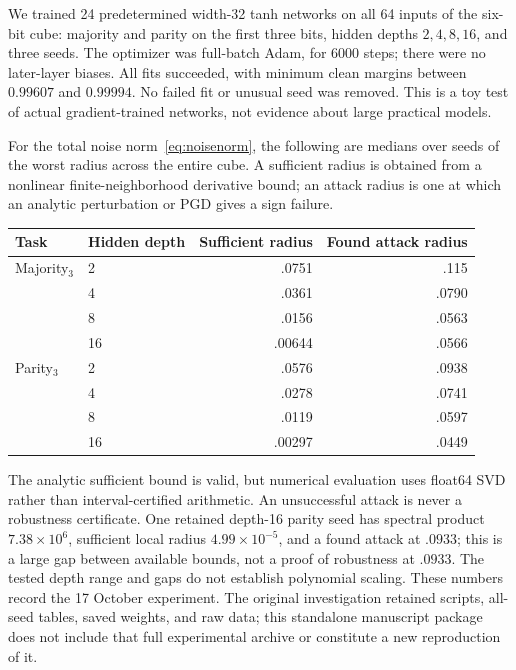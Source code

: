 \documentclass[11pt]{article}
\begin{document}
We trained 24 predetermined width-32 tanh networks on all 64 inputs of the
six-bit cube: majority and parity on the first three bits, hidden depths
$2,4,8,16$, and three seeds. The optimizer was full-batch Adam, for 6000 steps;
there were no later-layer biases. All fits succeeded, with minimum clean
margins between $0.99607$ and $0.99994$. No failed fit or unusual seed was
removed. This is a toy test of actual gradient-trained networks, not evidence
about large practical models.

For the total noise norm~\eqref{eq:noisenorm}, the following are medians over
seeds of the worst radius across the entire cube. A sufficient radius is
obtained from a nonlinear finite-neighborhood derivative bound; an attack
radius is one at which an analytic perturbation or PGD gives a sign failure.
\begin{center}
\begin{tabular}{llrr}
\toprule
Task & Hidden depth & Sufficient radius & Found attack radius\\
\midrule
Majority$_3$ & 2 & .0751 & .115\\
 & 4 & .0361 & .0790\\
 & 8 & .0156 & .0563\\
 & 16 & .00644 & .0566\\
Parity$_3$ & 2 & .0576 & .0938\\
 & 4 & .0278 & .0741\\
 & 8 & .0119 & .0597\\
 & 16 & .00297 & .0449\\
\bottomrule
\end{tabular}
\end{center}

The analytic sufficient bound is valid, but numerical evaluation uses
float64 SVD rather than interval-certified arithmetic. An unsuccessful
attack is never a robustness certificate. One retained depth-16 parity
seed has spectral product $7.38\times10^6$, sufficient local radius
$4.99\times10^{-5}$, and a found attack at $.0933$; this is a large gap
between available bounds, not a proof of robustness at $.0933$.
The tested depth range and gaps do not establish polynomial scaling.
These numbers record the 17 October experiment. The original investigation
retained scripts, all-seed tables, saved weights, and raw data; this
standalone manuscript package does not include that full experimental
archive or constitute a new reproduction of it.
\end{document}
